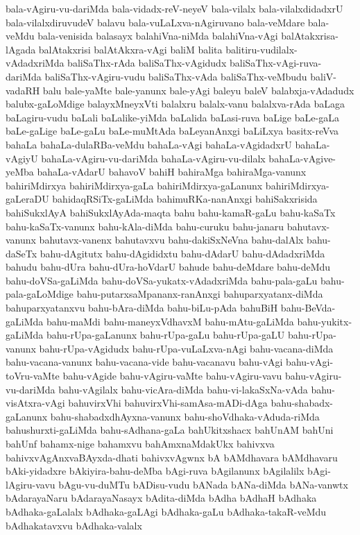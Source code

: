 {bala-vAgiru-vu-dariMda
bala-vidadx-reV-neyeV
bala-vilalx
bala-vilalxdidadxrU
bala-vilalxdiruvudeV
balavu
bala-vuLaLxva-nAgiruvano
bala-veMdare
bala-veMdu
bala-venisida
balasayx
balahiVna-niMda
balahiVna-vAgi
balAtakxrisa-lAgada
balAtakxrisi
balAtAkxra-vAgi
baliM
balita
balitiru-vudilalx-vAdadxriMda
baliSaThx-rAda
baliSaThx-vAgidudx
baliSaThx-vAgi-ruva-dariMda
baliSaThx-vAgiru-vudu
baliSaThx-vAda
baliSaThx-veMbudu
baliV-vadaRH
balu
bale-yaMte
bale-yanunx
bale-yAgi
baleyu
baleV
balabxja-vAdadudx
balubx-gaLoMdige
balayxMneyxVti
balalxru
balalx-vanu
balalxva-rAda
baLaga
baLagiru-vudu
baLali
baLalike-yiMda
baLalida
baLasi-ruva
baLige
baLe-gaLa
baLe-gaLige
baLe-gaLu
baLe-muMtAda
baLeyanAnxgi
baLiLxya
basitx-reVva
bahaLa
bahaLa-dulaRBa-veMdu
bahaLa-vAgi
bahaLa-vAgidadxrU
bahaLa-vAgiyU
bahaLa-vAgiru-vu-dariMda
bahaLa-vAgiru-vu-dilalx
bahaLa-vAgive-yeMba
bahaLa-vAdarU
bahavoV
bahiH
bahiraMga
bahiraMga-vanunx
bahiriMdirxya
bahiriMdirxya-gaLa
bahiriMdirxya-gaLanunx
bahiriMdirxya-gaLeraDU
bahidaqRSiTx-gaLiMda
bahimuRKa-nanAnxgi
bahiSakxrisida
bahiSukxlAyA
bahiSukxlAyAda-maqta
bahu
bahu-kamaR-gaLu
bahu-kaSaTx
bahu-kaSaTx-vanunx
bahu-kAla-diMda
bahu-curuku
bahu-janaru
bahutavx-vanunx
bahutavx-vanenx
bahutavxvu
bahu-dakiSxNeVna
bahu-dalAlx
bahu-daSeTx
bahu-dAgitutx
bahu-dAgididxtu
bahu-dAdarU
bahu-dAdadxriMda
bahudu
bahu-dUra
bahu-dUra-hoVdarU
bahude
bahu-deMdare
bahu-deMdu
bahu-doVSa-gaLiMda
bahu-doVSa-yukatx-vAdadxriMda
bahu-pala-gaLu
bahu-pala-gaLoMdige
bahu-putarxsaMpananx-ranAnxgi
bahuparxyatanx-diMda
bahuparxyatanxvu
bahu-bAra-diMda
bahu-biLu-pAda
bahuBiH
bahu-BeVda-gaLiMda
bahu-maMdi
bahu-maneyxVdhavxM
bahu-mAtu-gaLiMda
bahu-yukitx-gaLiMda
bahu-rUpa-gaLanunx
bahu-rUpa-gaLu
bahu-rUpa-gaLU
bahu-rUpa-vanunx
bahu-rUpa-vAgidudx
bahu-rUpa-vuLaLxva-nAgi
bahu-vacana-diMda
bahu-vacana-vanunx
bahu-vacana-vide
bahu-vacanavu
bahu-vAgi
bahu-vAgi-toVru-vaMte
bahu-vAgide
bahu-vAgiru-vaMte
bahu-vAgiru-vavu
bahu-vAgiru-vu-dariMda
bahu-vAgilalx
bahu-vicAra-diMda
bahu-vi-lakaSxNa-vAda
bahu-visAtxra-vAgi
bahuvirxVhi
bahuvirxVhi-samAsa-mADi-dAga
bahu-shabadx-gaLanunx
bahu-shabadxdhAyxna-vanunx
bahu-shoVdhaka-vAduda-riMda
bahushurxti-gaLiMda
bahu-sAdhana-gaLa
bahUkitxshacx
bahUnAM
bahUni
bahUnf
bahamx-nige
bahamxvu
bahAmxnaMdakUkx
bahivxva
bahivxvAgAnxvaBAyxda-dhati
bahivxvAgwnx
bA
bAMdhavara
bAMdhavaru
bAki-yidadxre
bAkiyira-bahu-deMba
bAgi-ruva
bAgilanunx
bAgilalilx
bAgi-lAgiru-vavu
bAgu-vu-duMTu
bADisu-vudu
bANada
bANa-diMda
bANa-vanwtx
bAdarayaNaru
bAdarayaNasayx
bAdita-diMda
bAdha
bAdhaH
bAdhaka
bAdhaka-gaLalalx
bAdhaka-gaLAgi
bAdhaka-gaLu
bAdhaka-takaR-veMdu
bAdhakatavxvu
bAdhaka-valalx
}
